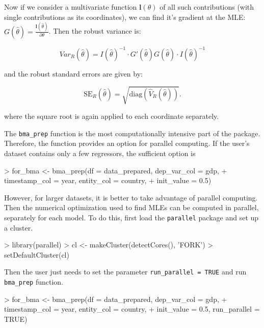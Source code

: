\documentclass[a4paper]{article}
\begin{document}
\noindent Now if we consider a multivariate function $\mathbf{l}(\theta)$ of all such contributions
(with single contributions as its coordinates),
we can find it's gradient at the MLE: $G(\hat{\theta}) = \frac{\mathbf{l}(\hat{\theta})}{\partial \theta}$.
Then the robust variance is:

\begin{equation}
Var_{R}(\hat{\theta}) = I(\hat{\theta})^{-1} \cdot G'(\hat{\theta}) G(\hat{\theta}) \cdot I(\hat{\theta})^{-1}
\end{equation}

\noindent and the robust standard errors are given by:

\begin{equation}
\text{SE}_{R}(\hat{\theta}) = \sqrt{\text{diag}(\hat{V}_{R}(\hat{\theta}))}.
\end{equation}

\noindent where the square root is again applied to each coordinate separately.

The \verb+bma_prep+ function is the most computationally intensive part of the package.
Therefore, the function provides an option for parallel computing.
If the user's dataset contains only a few regressors, the sufficient option is
\begin{Schunk}
\begin{Sinput}
> for_bma <- bma_prep(df = data_prepared, dep_var_col = gdp,
+                    timestamp_col = year, entity_col = country,
+                    init_value = 0.5)
\end{Sinput}
\end{Schunk}
However, for larger datasets, it is better to take advantage of parallel computing.
Then the numerical optimization used to find MLEs can be computed in parallel,
separately for each model.
To do this, first load the \verb+parallel+ package and set up a cluster.

\begin{Schunk}
\begin{Sinput}
> library(parallel)
> cl <- makeCluster(detectCores(), 'FORK')
> setDefaultCluster(cl)
\end{Sinput}
\end{Schunk}

\noindent Then the user just needs to set the parameter \verb+run_parallel = TRUE+
and run \verb+bma_prep+ function.

\begin{Schunk}
\begin{Sinput}
> for_bma <- bma_prep(df = data_prepared, dep_var_col = gdp,
+                    timestamp_col = year, entity_col = country,
+                    init_value = 0.5, run_parallel = TRUE)
\end{Sinput}
\end{Schunk}
\end{document}
